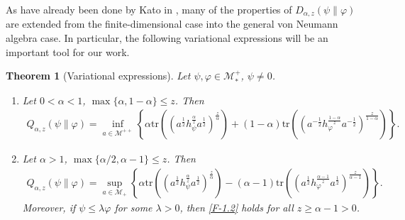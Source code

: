 \documentclass[12pt]{article}
\newtheorem{theorem}{Theorem}[section]
\theoremstyle{definition}
\theoremstyle{remark}
\numberwithin{equation}{section}
\def\Me{\mathcal M}
\def\Tr{\mathrm{tr}}
\def\ffi{\varphi}
\begin{document}
{As have already been done by Kato in \cite{kato2023onrenyi}, many of the properties of
$D_{\alpha,z}(\psi\|\varphi)$ are extended from the finite-dimensional case into the general von Neumann
algebra case}. In particular, the following variational expressions will be an important tool for our work.

\begin{theorem}[Variational expressions]\label{thm:variational} Let $\psi,\varphi\in \Me_*^+$, $\psi\ne 0$. 
\begin{enumerate}
\item[(i)] Let $0<\alpha<1$, $\max\{\alpha,1-\alpha\}\le z$. Then
\begin{align}\label{F-1.1}
Q_{\alpha,z}(\psi\|\varphi)=\inf_{a\in \Me^{++}}\left\{\alpha
\Tr\left((a^{\frac12}h_\psi^{\frac{\alpha}{z}}a^{\frac12})^{\frac{z}{\alpha}}\right)+(1-\alpha)
\Tr\left((a^{-\frac12}h_\varphi^{\frac{1-\alpha}{z}}a^{-\frac12})^{\frac{z}{1-\alpha}}\right) \right\}.
\end{align}

\item[(ii)] Let $\alpha>1$, $\max\{\alpha/2,\alpha-1\}\le z$. Then
\begin{align}\label{F-1.2}
Q_{\alpha,z}(\psi\|\varphi)=\sup_{a\in \Me_+} \left\{\alpha
\Tr\left((a^{\frac12}h_\psi^{\frac{\alpha}{z}}a^{\frac12})^{\frac{z}{\alpha}}\right)-(\alpha-1)
\Tr\left((a^{\frac12}h_\varphi^{\frac{\alpha-1}{z}}a^{\frac12})^{\frac{z}{\alpha-1}}\right) \right\}.
\end{align}
{Moreover, if $\psi\le\lambda\ffi$ for some $\lambda>0$, then \eqref{F-1.2} holds for all
$z\ge\alpha-1>0$. }
\end{enumerate}
\end{theorem}
\end{document}

